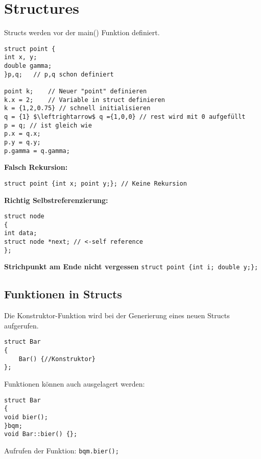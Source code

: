 \section{Structures}

Structs werden vor der main() Funktion definiert.
\begin{lstlisting}[mathescape]
struct point {
int x, y;
double gamma;
}p,q; 	// p,q schon definiert

point k; 	// Neuer "point" definieren
k.x = 2;	// Variable in struct definieren
k = {1,2,0.75} // schnell initialisieren
q = {1} $\leftrightarrow$ q ={1,0,0} // rest wird mit 0 aufgefüllt
p = q; // ist gleich wie
p.x = q.x; 
p.y = q.y;
p.gamma = q.gamma;
\end{lstlisting}

\textbf{Falsch Rekursion:} 
\begin{lstlisting}[mathescape]
struct point {int x; point y;}; // Keine Rekursion
\end{lstlisting}
\textbf{Richtig Selbstreferenzierung:} 
\begin{lstlisting}[mathescape]
struct node
{
int data;
struct node *next; // <-self reference
};
\end{lstlisting}
\textbf{Strichpunkt am Ende nicht vergessen} 
\texttt{struct point \{int i; double y;\};}

\subsection{Funktionen in Structs}
Die Konstruktor-Funktion wird bei der Generierung eines neuen Structs aufgerufen.
\begin{lstlisting}[mathescape]
struct Bar
{
	Bar() {//Konstruktor}
};
\end{lstlisting}
Funktionen können auch ausgelagert werden:
\begin{lstlisting}[mathescape]
struct Bar
{
void bier();
}bqm;
void Bar::bier() {};
\end{lstlisting}
Aufrufen der Funktion: \texttt{bqm.bier();}


























